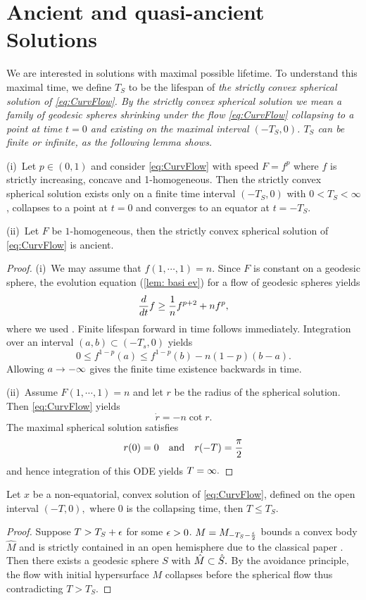 \documentclass{amsart}
\begin{document}
\section{Ancient and quasi-ancient Solutions}\label{quasi}
We are interested in solutions with maximal possible lifetime. To understand this maximal time, we define $T_S$ to be the lifespan of \it{the strictly convex spherical solution} of \eqref{eq:CurvFlow}. By the strictly convex spherical solution we mean a family of geodesic spheres shrinking under the flow \eqref{eq:CurvFlow} collapsing to a point at time $t=0$ and existing on the maximal interval \((-T_S, 0)\). \(T_S\) can be finite or infinite, as the following lemma shows.
\begin{lemma}
\label{lem:spherical_existence_time}
 (i)~Let $p\in(0,1)$ and consider \eqref{eq:CurvFlow} with speed \(F = f^p\) where \(f\) is strictly increasing, concave and 1-homogeneous. Then the strictly convex spherical solution exists only on a finite time interval \((-T_S,0)\) with \(0 < T_S < \infty\), collapses to a point at \(t=0\) and converges to an equator at \(t=-T_S\).
 
(ii)~Let $F$ be $1$-homogeneous, then the strictly convex spherical solution of \eqref{eq:CurvFlow} is ancient.
\end{lemma}
\begin{proof}
(i)~We may assume that $f(1,\cdots,1)=n.$
Since $F$ is constant on a geodesic sphere, the evolution equation (\ref{lem: basi ev}) for a flow of geodesic spheres yields
$$\frac{d}{dt}f\geq \frac{1}{n} f^{p+2}+ nf^{p},$$
where we used \cite[Lemma~2.2.19, Lemma~2.2.20]{Gerhardt:/2006}.
Finite lifespan forward in time follows immediately. Integration over an interval $(a,b) \subset (-T_s, 0)$ yields
$$0\leq f^{1-p}(a)\leq f^{1-p}(b)-n(1-p)(b-a).$$
Allowing $a\rightarrow-\infty$ gives the finite time existence backwards in time.

(ii)~Assume $F(1,\cdots,1)=n$ and let $r$ be the radius of the spherical solution. Then \eqref{eq:CurvFlow} yields
\[\dot{r}=-n\cot{r}.\]
The maximal spherical solution satisfies
\[r(0)=0\quad\text{and}\quad r(-T)=\frac{\pi}{2}\]
and hence integration of this ODE yields $T=\infty.$
\end{proof}
\begin{lemma}
Let $x$ be a non-equatorial, convex solution of \eqref{eq:CurvFlow}, defined on the open interval $(-T,0),$ where $0$ is the collapsing time, then $T\leq T_S.$
\end{lemma}
\begin{proof}
Suppose $T>T_S+\epsilon$ for some $\epsilon>0$. $M=M_{-T_S-\frac{\epsilon}{2}}$ bounds a convex body $\hat{M}$ and is strictly contained in an open hemisphere due to the classical paper \cite{CarmoWarner:/1970}. Then there exists a geodesic sphere $S$ with $\hat{M}\subset\hat{S}.$ By the avoidance principle, the flow with initial hypersurface $M$ collapses before the spherical flow thus contradicting $T>T_S$.
\end{proof}
\end{document}
